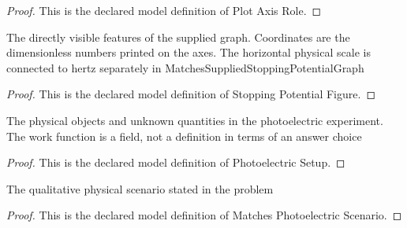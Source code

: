 \begin{proof}
  This is the declared model definition of Plot Axis Role.
\end{proof}
\begin{definition}
  \label{def:physics:phyx-mini-0515:phyxminiproblems-problemphyxmini0515-stoppingpotentialfigure}
  The directly visible features of the supplied graph. Coordinates are the dimensionless numbers printed on the axes. The horizontal physical scale is connected to hertz separately in MatchesSuppliedStoppingPotentialGraph
\end{definition}
\begin{proof}
  This is the declared model definition of Stopping Potential Figure.
\end{proof}
\begin{definition}
  \label{def:physics:phyx-mini-0515:phyxminiproblems-problemphyxmini0515-photoelectricsetup}
  The physical objects and unknown quantities in the photoelectric experiment. The work function is a field, not a definition in terms of an answer choice
\end{definition}
\begin{proof}
  This is the declared model definition of Photoelectric Setup.
\end{proof}
\begin{definition}
  \label{def:physics:phyx-mini-0515:phyxminiproblems-problemphyxmini0515-matchesphotoelectricscenario}
  The qualitative physical scenario stated in the problem
\end{definition}
\begin{proof}
  This is the declared model definition of Matches Photoelectric Scenario.
\end{proof}
